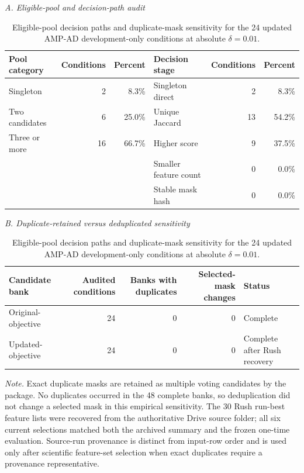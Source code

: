 \begin{table}[p]
\centering
\caption{Eligible-pool decision paths and duplicate-mask sensitivity for the 24 updated AMP-AD development-only conditions at absolute $\delta=0.01$.}
\label{tab:supp20}
\scriptsize
\setlength{\tabcolsep}{4.2pt}
\renewcommand{\arraystretch}{1.08}
\textit{A. Eligible-pool and decision-path audit}\par\smallskip
\begin{tabular}{lrr@{\hspace{1.2cm}}lrr}
\toprule
Pool category & Conditions & Percent & Decision stage & Conditions & Percent \\
\midrule
Singleton & 2 & 8.3\% & Singleton direct & 2 & 8.3\% \\
Two candidates & 6 & 25.0\% & Unique Jaccard & 13 & 54.2\% \\
Three or more & 16 & 66.7\% & Higher score & 9 & 37.5\% \\
 & & & Smaller feature count & 0 & 0.0\% \\
 & & & Stable mask hash & 0 & 0.0\% \\
\bottomrule
\end{tabular}

\vspace{0.8em}
\textit{B. Duplicate-retained versus deduplicated sensitivity}\par\smallskip
\begin{tabular}{lrrrl}
\toprule
Candidate bank & Audited conditions & Banks with duplicates & Selected-mask changes & Status \\
\midrule
Original-objective & 24 & 0 & 0 & Complete \\
Updated-objective & 24 & 0 & 0 & Complete after Rush recovery \\
\bottomrule
\end{tabular}
\par\smallskip
\parbox{0.98\linewidth}{\scriptsize\textit{Note.} Exact duplicate masks are retained as multiple voting candidates by the package. No duplicates occurred in the 48 complete banks, so deduplication did not change a selected mask in this empirical sensitivity. The 30 Rush run-best feature lists were recovered from the authoritative Drive source folder; all six current selections matched both the archived summary and the frozen one-time evaluation. Source-run provenance is distinct from input-row order and is used only after scientific feature-set selection when exact duplicates require a provenance representative.}
\end{table}
